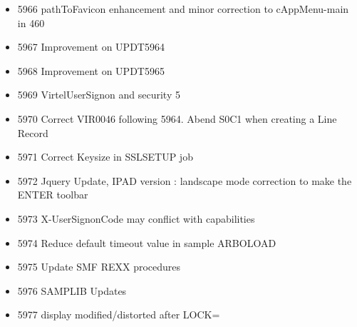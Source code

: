 \documentclass[letterpaper,10pt,english]{sphinxmanual}
\begin{document}
\begin{itemize}
\item {} 
5966 pathToFavicon enhancement and minor correction to cAppMenu-main in 460

\item {} 
5967 Improvement on UPDT5964

\item {} 
5968 Improvement on UPDT5965

\item {} 
5969 VirtelUserSignon and security 5

\item {} 
5970 Correct VIR0046 following 5964. Abend S0C1 when creating a Line Record

\item {} 
5971 Correct Keysize in SSLSETUP job

\item {} 
5972 Jquery Update, IPAD version : landscape mode correction to make the ENTER toolbar

\item {} 
5973 X-UserSignonCode may conflict with capabilities

\item {} 
5974 Reduce default timeout value in sample ARBOLOAD

\item {} 
5975 Update SMF REXX procedures

\item {} 
5976 SAMPLIB Updates

\item {} 
5977 display modified/distorted after LOCK=

\end{itemize}



\renewcommand{\indexname}{Index}
\printindex
\end{document}
